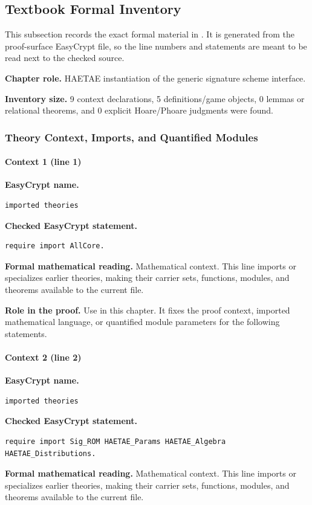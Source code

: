 \subsection*{Textbook Formal Inventory}
This subsection records the exact formal material in .  It is generated from the proof-surface EasyCrypt file, so the line numbers and statements are meant to be read next to the checked source.

\noindent\textbf{Chapter role.} HAETAE instantiation of the generic signature scheme interface.

\noindent\textbf{Inventory size.} 9 context declarations, 5 definitions/game objects, 0 lemmas or relational theorems, and 0 explicit Hoare/Phoare judgments were found.

\subsubsection*{Theory Context, Imports, and Quantified Modules}
\paragraph{Context 1 (line 1)}
\noindent\textbf{EasyCrypt name.}
\begin{lstlisting}[language=EasyCrypt,basicstyle=\ttfamily\scriptsize]
imported theories
\end{lstlisting}
\noindent\textbf{Checked EasyCrypt statement.}
\begin{lstlisting}[language=EasyCrypt,basicstyle=\ttfamily\scriptsize]
require import AllCore.
\end{lstlisting}
\noindent\textbf{Formal mathematical reading.}
Mathematical context. This line imports or specializes earlier theories, making their carrier sets, functions, modules, and theorems available to the current file.

\noindent\textbf{Role in the proof.}
Use in this chapter. It fixes the proof context, imported mathematical language, or quantified module parameters for the following statements.

\paragraph{Context 2 (line 2)}
\noindent\textbf{EasyCrypt name.}
\begin{lstlisting}[language=EasyCrypt,basicstyle=\ttfamily\scriptsize]
imported theories
\end{lstlisting}
\noindent\textbf{Checked EasyCrypt statement.}
\begin{lstlisting}[language=EasyCrypt,basicstyle=\ttfamily\scriptsize]
require import Sig_ROM HAETAE_Params HAETAE_Algebra HAETAE_Distributions.
\end{lstlisting}
\noindent\textbf{Formal mathematical reading.}
Mathematical context. This line imports or specializes earlier theories, making their carrier sets, functions, modules, and theorems available to the current file.

